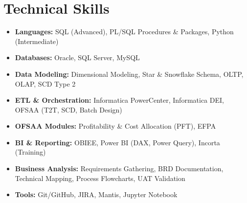 \section{Technical Skills}

\begin{itemize}
  \item \textbf{Languages:} SQL (Advanced), PL/SQL Procedures \& Packages, Python (Intermediate)
  \item \textbf{Databases:} Oracle, SQL Server, MySQL
  \item \textbf{Data Modeling:} Dimensional Modeling, Star \& Snowflake Schema, OLTP, OLAP, SCD Type 2
  \item \textbf{ETL \& Orchestration:} Informatica PowerCenter, Informatica DEI, OFSAA (T2T, SCD, Batch Design)
  \item \textbf{OFSAA Modules:} Profitability \& Cost Allocation (PFT), EFPA
  \item \textbf{BI \& Reporting:} OBIEE, Power BI (DAX, Power Query), Incorta (Training)
  \item \textbf{Business Analysis:} Requirements Gathering, BRD Documentation, Technical Mapping, Process Flowcharts, UAT Validation
  \item \textbf{Tools:} Git/GitHub, JIRA, Mantis, Jupyter Notebook
\end{itemize}